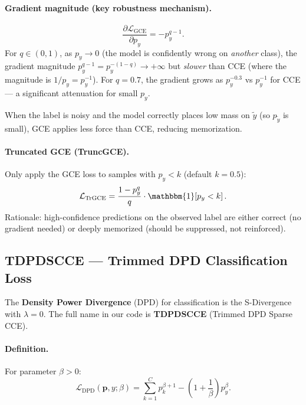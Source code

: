 \documentclass[11pt,a4paper]{article}
\newcommand{\Lcal}{\mathcal{L}}
\newcommand{\ind}[1]{\mathbbm{1}\!\left[#1\right]}
\newcommand{\py}{p_y}
\newcommand{\pb}{\mathbf{p}}
\begin{document}
\paragraph{Gradient magnitude (key robustness mechanism).}
\begin{equation}
  \frac{\partial \Lcal_{\mathrm{GCE}}}{\partial \py} = -\py^{q-1}.
\end{equation}
For $q \in (0,1)$, as $\py \to 0$ (the model is confidently wrong on \emph{another} class),
the gradient magnitude $\py^{q-1} = \py^{-(1-q)} \to +\infty$ but \emph{slower} than CCE
(where the magnitude is $1/\py = \py^{-1}$). For $q=0.7$, the gradient grows as
$\py^{-0.3}$ vs $\py^{-1}$ for CCE — a significant attenuation for small $\py$.

When the label is noisy and the model correctly places low mass on $\tilde y$
(so $p_{\tilde y}$ is small), GCE applies less force than CCE, reducing memorization.

\paragraph{Truncated GCE (TruncGCE).}
Only apply the GCE loss to samples with $p_y < k$ (default $k=0.5$):
\[
  \Lcal_{\mathrm{TrGCE}} = \frac{1-\py^q}{q} \cdot \ind{\py < k}.
\]
Rationale: high-confidence predictions on the observed label are either correct (no gradient needed)
or deeply memorized (should be suppressed, not reinforced).

\subsection{TDPDSCCE — Trimmed DPD Classification Loss}
\label{sec:tdpdscce}

The \textbf{Density Power Divergence} (DPD) for classification is the S-Divergence
with $\lambda = 0$. The full name in our code is \textbf{TDPDSCCE} (Trimmed DPD Sparse CCE).

\paragraph{Definition.}
For parameter $\beta > 0$:
\begin{equation}
  \label{eq:dpd}
  \Lcal_{\mathrm{DPD}}(\pb, y; \beta) = \sum_{k=1}^C p_k^{\beta+1} - \left(1 + \frac{1}{\beta}\right)\py^\beta.
\end{equation}
\end{document}

